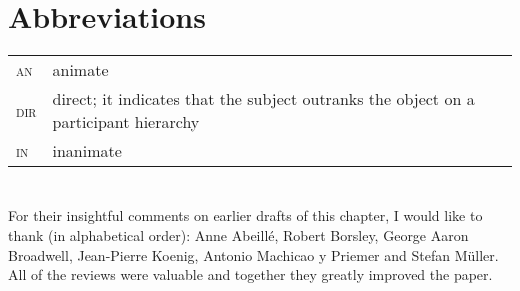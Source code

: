 \documentclass[output=paper,biblatex,babelshorthands,newtxmath,draftmode,colorlinks,citecolor=brown]{langscibook}
\begin{document}
\largerpage[2]
\section*{Abbreviations}

%
\begin{tabularx}{.99\textwidth}{@{}lX}
\textsc{an}  & animate\\
\textsc{dir} & direct; it indicates that the subject outranks the object on a participant hierarchy\\
\textsc{in}  & inanimate\\
\end{tabularx}



\section*{\acknowledgmentsUS}

For their insightful comments on earlier drafts of this chapter, I would like to thank (in
alphabetical order): Anne Abeillé, Robert Borsley, George Aaron Broadwell, Jean-Pierre Koenig,
Antonio Machicao y Priemer and Stefan Müller. All of the reviews were valuable and together they
greatly improved the paper.





{\sloppy
\printbibliography[heading=subbibliography,notkeyword=this] 
}
\end{document}
